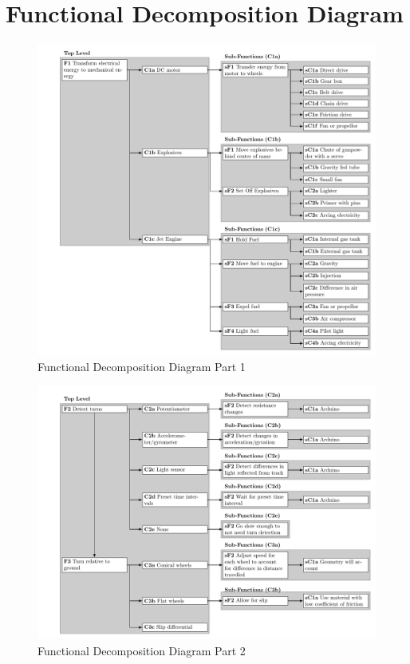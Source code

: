 \documentclass[class=../../report, crop=false]{standalone}
\begin{document}
\section{Functional Decomposition Diagram} \label{app:funcdecomp}

\begin{figure}[!htb]
	\centering
	\includegraphics[width=\textwidth]{../../../bin/funcdecomp-1}
	\caption{Functional Decomposition Diagram Part 1}
\end{figure}
\begin{figure}[!htb]
	\ContinuedFloat
	\centering
	\includegraphics[width=\textwidth]{../../../bin/funcdecomp-2}
	\caption{Functional Decomposition Diagram Part 2}
\end{figure}
\end{document}
